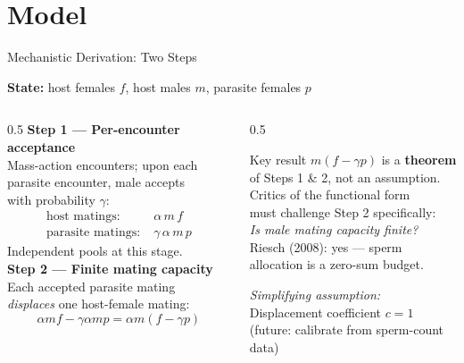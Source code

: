 \documentclass{beamer}
\begin{document}
\section{Model}

\begin{frame}{Mechanistic Derivation: Two Steps}
  \footnotesize

  \textbf{State:} host females $f$, host males $m$, parasite females $p$

  \vspace{0.3cm}
  \begin{columns}[T]
    \begin{column}{0.5\textwidth}
      \textbf{Step 1 — Per-encounter acceptance}\\[4pt]
      Mass-action encounters; upon each\\
      parasite encounter, male accepts\\
      with probability $\gamma$:
      \begin{align*}
        \text{host matings:}    &\;\alpha\,m\,f \\
        \text{parasite matings:}&\;\gamma\,\alpha\,m\,p
      \end{align*}
      Independent pools at this stage.\\[8pt]

      \textbf{Step 2 — Finite mating capacity}\\[4pt]
      Each accepted parasite mating\\
      \emph{displaces} one host-female mating:
      \[
        \alpha m f - \gamma\alpha m p
        = \alpha m(f - \gamma p)
      \]
    \end{column}

    \begin{column}{0.5\textwidth}
      \begin{alertblock}{Key result}
        $m(f - \gamma p)$ is a \textbf{theorem}\\
        of Steps 1 \& 2, not an assumption.\\[6pt]
        Critics of the functional form\\
        must challenge Step 2 specifically:\\
        \emph{Is male mating capacity finite?}\\[6pt]
        Riesch (2008): yes --- sperm\\
        allocation is a zero-sum budget.
      \end{alertblock}

      \vspace{0.2cm}
      \textit{Simplifying assumption:}\\
      Displacement coefficient $c=1$\\
      (future: calibrate from sperm-count data)
    \end{column}
  \end{columns}

\end{frame}
\end{document}
